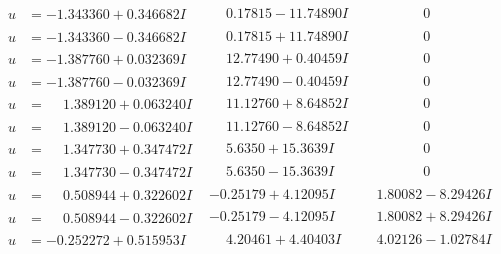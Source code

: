 \documentclass[1p]{elsarticle_modified}
\theoremstyle{definition}
\begin{document}
$$\begin{array}{c|c|c}
\begin{aligned}
u &= -1.343360 + 0.346682 I\end{aligned}
 & \phantom{-}0.17815 - 11.74890 I & \phantom{-0.000000 } 0 \\ \hline\begin{aligned}
u &= -1.343360 - 0.346682 I\end{aligned}
 & \phantom{-}0.17815 + 11.74890 I & \phantom{-0.000000 } 0 \\ \hline\begin{aligned}
u &= -1.387760 + 0.032369 I\end{aligned}
 & \phantom{-}12.77490 + 0.40459 I & \phantom{-0.000000 } 0 \\ \hline\begin{aligned}
u &= -1.387760 - 0.032369 I\end{aligned}
 & \phantom{-}12.77490 - 0.40459 I & \phantom{-0.000000 } 0 \\ \hline\begin{aligned}
u &= \phantom{-}1.389120 + 0.063240 I\end{aligned}
 & \phantom{-}11.12760 + 8.64852 I & \phantom{-0.000000 } 0 \\ \hline\begin{aligned}
u &= \phantom{-}1.389120 - 0.063240 I\end{aligned}
 & \phantom{-}11.12760 - 8.64852 I & \phantom{-0.000000 } 0 \\ \hline\begin{aligned}
u &= \phantom{-}1.347730 + 0.347472 I\end{aligned}
 & \phantom{-}5.6350 + 15.3639 I & \phantom{-0.000000 } 0 \\ \hline\begin{aligned}
u &= \phantom{-}1.347730 - 0.347472 I\end{aligned}
 & \phantom{-}5.6350 - 15.3639 I & \phantom{-0.000000 } 0 \\ \hline\begin{aligned}
u &= \phantom{-}0.508944 + 0.322602 I\end{aligned}
 & -0.25179 + 4.12095 I & \phantom{-}1.80082 - 8.29426 I \\ \hline\begin{aligned}
u &= \phantom{-}0.508944 - 0.322602 I\end{aligned}
 & -0.25179 - 4.12095 I & \phantom{-}1.80082 + 8.29426 I \\ \hline\begin{aligned}
u &= -0.252272 + 0.515953 I\end{aligned}
 & \phantom{-}4.20461 + 4.40403 I & \phantom{-}4.02126 - 1.02784 I \\ \hline\begin{aligned}

\end{aligned}
\end{array}$$
\end{document}
